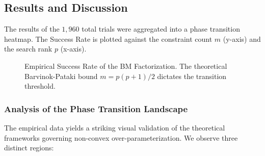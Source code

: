     
    
            
            

        

\subsection{Results and Discussion}
The results of the $1,960$ total trials were aggregated into a phase transition heatmap. The Success Rate is plotted against the constraint count $m$ (y-axis) and the search rank $p$ (x-axis). 

\begin{figure}[htbp]
  \centering
  \caption{Empirical Success Rate of the BM Factorization. The theoretical Barvinok-Pataki bound $m = p(p+1)/2$ dictates the transition threshold.}
  \label{fig:heatmap}
\end{figure}

\subsubsection{Analysis of the Phase Transition Landscape}
The empirical data yields a striking visual validation of the theoretical frameworks governing non-convex over-parameterization. We observe three distinct regions:

